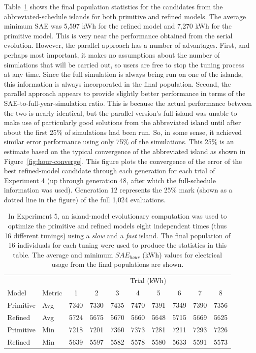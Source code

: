 \documentclass[preprint, review, 12pt]{elsarticle}
\begin{document}
Table~\ref{tab:hourly-parallel} shows the final population statistics for the candidates from the abbreviated-schedule islands for both primitive and refined models. The average minimum SAE was 5,597 kWh for the refined model and 7,270 kWh for the primitive model. This is very near the performance obtained from the serial evolution. However, the parallel approach has a number of advantages. First, and perhaps most important, it makes no assumptions about the number of simulations that will be carried out, so users are free to stop the tuning process at any time. Since the full simulation is always being run on one of the islands, this information is always incorporated in the final population. Second, the parallel approach appears to provide slightly better performance in terms of the SAE-to-full-year-simulation ratio. This is because the actual performance between the two is nearly identical, but the parallel version's full island was unable to make use of particularly good solutions from the abbreviated island until after about the first 25\% of simulations had been run. So, in some sense, it achieved similar error performance using only 75\% of the simulations. This 25\% is an estimate based on the typical convergence of the abbreviated island as shown in Figure~\ref{fig:hour-converge}. This figure plots the convergence of the error of the best refined-model candidate through each generation for each trial of Experiment 4 (up through generation 48, after which the full-schedule information was used). Generation 12 represents the 25\% mark (shown as a dotted line in the figure) of the full 1,024 evaluations.

\begin{table}[htbp]
\centering
\caption{In Experiment 5, an island-model evolutionary computation was used to optimize the primitive and refined models eight independent times (thus 16 different tunings) using a \emph{slow} and a \emph{fast} island. The final population of 16 individuals for each tuning were used to produce the statistics in this table. The average and minimum $SAE_{hour}$ (kWh) values for electrical usage from the final populations are shown.}
\label{tab:hourly-parallel}
\begin{tabular}{llcccccccc}
\toprule
 &  & \multicolumn{8}{c}{Trial (kWh)}\\
Model & Metric & 1 & 2 & 3 & 4 & 5 & 6 & 7 & 8\\
\midrule
Primitive & Avg & 7340 & 7330 & 7435 & 7470 & 7391 & 7349 & 7390 & 7356\\\rowcolor{DarkRow}
Refined   & Avg & 5724 & 5675 & 5670 & 5660 & 5648 & 5715 & 5669 & 5625\\
Primitive & Min & 7218 & 7201 & 7360 & 7373 & 7281 & 7211 & 7293 & 7226\\\rowcolor{DarkRow}
Refined   & Min & 5639 & 5597 & 5582 & 5578 & 5580 & 5633 & 5591 & 5573\\
\bottomrule
\end{tabular}
\end{table}
\end{document}
